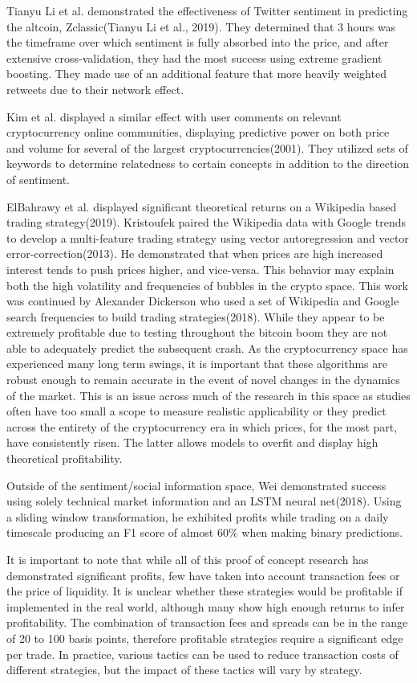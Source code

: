 \documentclass[12pt,twoside]{dukestatscithesis}
\begin{document}
Tianyu Li et al. demonstrated the effectiveness of Twitter sentiment in
predicting the altcoin, Zclassic(Tianyu Li et al., 2019). They
determined that 3 hours was the timeframe over which sentiment is fully
absorbed into the price, and after extensive cross-validation, they had
the most success using extreme gradient boosting. They made use of an
additional feature that more heavily weighted retweets due to their
network effect.

Kim et al. displayed a similar effect with user comments on relevant
cryptocurrency online communities, displaying predictive power on both
price and volume for several of the largest cryptocurrencies(2001). They
utilized sets of keywords to determine relatedness to certain concepts
in addition to the direction of sentiment.

ElBahrawy et al. displayed significant theoretical returns on a
Wikipedia based trading strategy(2019). Kristoufek paired the Wikipedia
data with Google trends to develop a multi-feature trading strategy
using vector autoregression and vector error-correction(2013). He
demonstrated that when prices are high increased interest tends to push
prices higher, and vice-versa. This behavior may explain both the high
volatility and frequencies of bubbles in the crypto space. This work was
continued by Alexander Dickerson who used a set of Wikipedia and Google
search frequencies to build trading strategies(2018). While they appear
to be extremely profitable due to testing throughout the bitcoin boom
they are not able to adequately predict the subsequent crash. As the
cryptocurrency space has experienced many long term swings, it is
important that these algorithms are robust enough to remain accurate in
the event of novel changes in the dynamics of the market. This is an
issue across much of the research in this space as studies often have
too small a scope to measure realistic applicability or they predict
across the entirety of the cryptocurrency era in which prices, for the
most part, have consistently risen. The latter allows models to overfit
and display high theoretical profitability.

Outside of the sentiment/social information space, Wei demonstrated
success using solely technical market information and an LSTM neural
net(2018). Using a sliding window transformation, he exhibited profits
while trading on a daily timescale producing an F1 score of almost 60\%
when making binary predictions.

It is important to note that while all of this proof of concept research
has demonstrated significant profits, few have taken into account
transaction fees or the price of liquidity. It is unclear whether these
strategies would be profitable if implemented in the real world,
although many show high enough returns to infer profitability. The
combination of transaction fees and spreads can be in the range of 20 to
100 basis points, therefore profitable strategies require a significant
edge per trade. In practice, various tactics can be used to reduce
transaction costs of different strategies, but the impact of these
tactics will vary by strategy.
\end{document}
